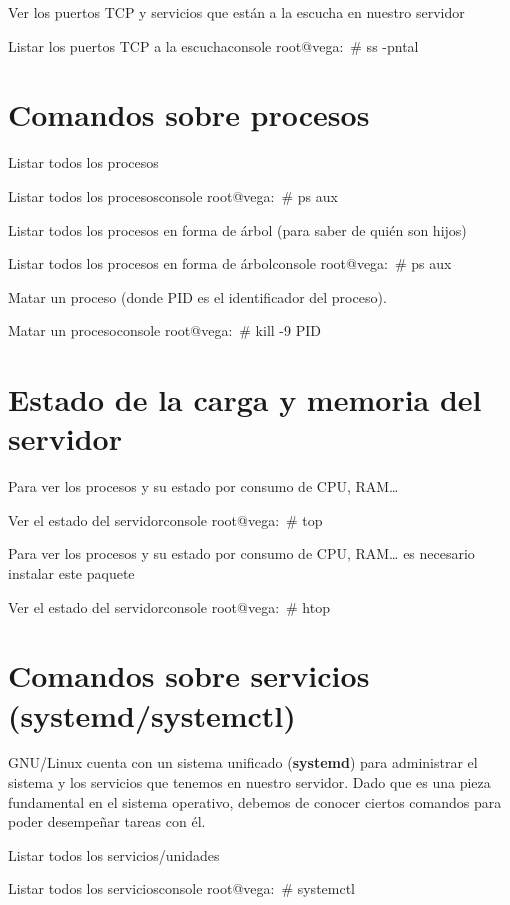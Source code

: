Ver los puertos TCP y servicios que están a la escucha en nuestro servidor
\begin{mycode}{Listar los puertos TCP a la escucha}{console}{}
root@vega:~# ss -pntal
\end{mycode}

\section{Comandos sobre procesos}
Listar todos los procesos
\begin{mycode}{Listar todos los procesos}{console}{}
root@vega:~# ps aux
\end{mycode}

Listar todos los procesos en forma de árbol (para saber de quién son hijos)
\begin{mycode}{Listar todos los procesos en forma de árbol}{console}{}
root@vega:~# ps aux
\end{mycode}

Matar un proceso (donde PID es el identificador del proceso).
\begin{mycode}{Matar un proceso}{console}{}
root@vega:~# kill -9 PID
\end{mycode}

\section{Estado de la carga y memoria del servidor}
Para ver los procesos y su estado por consumo de CPU, RAM…
\begin{mycode}{Ver el estado del servidor}{console}{}
root@vega:~# top
\end{mycode}

Para ver los procesos y su estado por consumo de CPU, RAM… es necesario instalar este paquete
\begin{mycode}{Ver el estado del servidor}{console}{}
root@vega:~# htop
\end{mycode}

\section{Comandos sobre servicios (systemd/systemctl)}
GNU/Linux cuenta con un sistema unificado (\textbf{systemd}) para administrar el sistema y los servicios que tenemos en nuestro servidor. Dado que es una pieza fundamental en el sistema operativo, debemos de conocer ciertos comandos para poder desempeñar tareas con él.

Listar todos los servicios/unidades
\begin{mycode}{Listar todos los servicios}{console}{}
root@vega:~# systemctl
\end{mycode}

